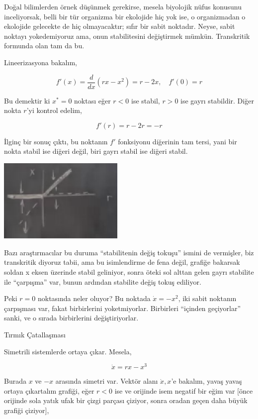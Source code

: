 \documentclass[12pt,fleqn]{article}\usepackage{../../common}
\begin{document}
Doğal bilimlerden örnek düşünmek gerekirse, mesela biyolojik nüfus konusunu
inceliyorsak, belli bir tür organizma bir ekolojide hiç yok ise, o organizmadan
o ekolojide gelecekte de hiç olmayacaktır; sıfır bir sabit noktadır. Neyse,
sabit noktayı yokedemiyoruz ama, onun stabilitesini değiştirmek
mümkün. Transkritik formunda olan tam da bu.

Lineerizasyona bakalım,

$$ f'(x) = \frac{d}{dx} (rx - x^2) = r - 2x, \quad f'(0) = r$$

Bu demektir ki $x^\ast = 0$ noktası eğer $r<0$ ise stabil, $r>0$ ise gayrı
stabildir. Diğer nokta $r$'yi kontrol edelim,

$$ f'(r) = r - 2r = -r $$

İlginç bir sonuç çıktı, bu noktanın $f'$ fonksiyonu diğerinin tam tersi, yani
bir nokta stabil ise diğeri değil, biri gayrı stabil ise diğeri stabil.

\includegraphics[height=4cm]{02_18.png}

Bazı araştırmacılar bu duruma ``stabilitenin değiş tokuşu'' ismini de vermişler,
biz transkritik diyoruz tabii, ama bu isimlendirme de fena değil, grafiğe
bakarsak soldan x eksen üzerinde stabil geliniyor, sonra öteki sol alttan gelen
gayrı stabilite ile ``çarpışma'' var, bunun ardından stabilite değiş tokuş
ediliyor. 

Peki $r=0$ noktasında neler oluyor? Bu noktada $\dot{x}=-x^2$, iki sabit
noktanın çarpışması var, fakat birbirlerini yoketmiyorlar. Birbirleri ``içinden
geçiyorlar'' sanki, ve o sırada birbirlerini değiştiriyorlar. 

Tırmık Çatallaşması

Simetrili sistemlerde ortaya çıkar. Mesela,

$$ \dot{x} = rx - x^3 $$

Burada $x$ ve $-x$ arasında simetri var. Vektör alanı $\dot{x},x$'e bakalım,
yavaş yavaş ortaya çıkartalım grafiği, eğer $r<0$ ise ve orijinde isem negatif
bir eğim var [önce orijinde sola yatık ufak bir çizgi parçası çiziyor, sonra
oradan geçen daha büyük grafiği çiziyor], 
\end{document}
